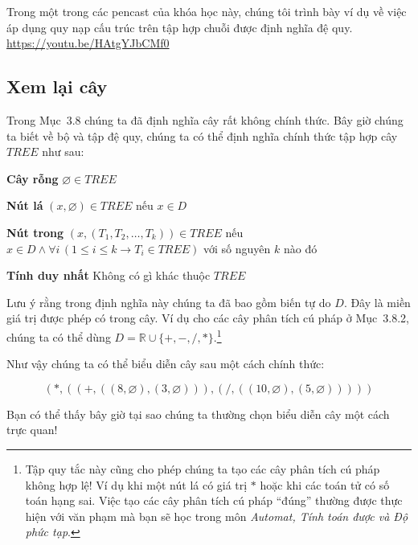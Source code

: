 \begin{infobox}
Trong một trong các pencast của khóa học này, chúng tôi trình bày ví dụ về việc áp dụng quy nạp cấu trúc trên tập hợp chuỗi được định nghĩa đệ quy. \url{https://youtu.be/HAtgYJbCMf0}
\end{infobox}

\subsection{Xem lại cây}

Trong Mục~3.8 chúng ta đã định nghĩa cây rất không chính thức. Bây giờ chúng ta biết về bộ và tập đệ quy, chúng ta có thể định nghĩa chính thức tập hợp cây $TREE$ như sau:

\medskip
\noindent\textbf{Cây rỗng} $\varnothing \in TREE$

\noindent\textbf{Nút lá} $(x, \varnothing) \in TREE$ nếu $x \in D$

\noindent\textbf{Nút trong} $(x, (T_1, T_2, \ldots, T_k)) \in TREE$ nếu $x \in D \land \forall i\,(1 \leq i \leq k \to T_i \in TREE)$ với số nguyên $k$ nào đó

\noindent\textbf{Tính duy nhất} Không có gì khác thuộc $TREE$

\medskip
Lưu ý rằng trong định nghĩa này chúng ta đã bao gồm biến tự do $D$. Đây là miền giá trị được phép có trong cây. Ví dụ cho các cây phân tích cú pháp ở Mục~3.8.2, chúng ta có thể dùng $D = \mathbb{R} \cup \{+, -, /, *\}$.\footnote{Tập quy tắc này cũng cho phép chúng ta tạo các cây phân tích cú pháp không hợp lệ! Ví dụ khi một nút lá có giá trị $*$ hoặc khi các toán tử có số toán hạng sai. Việc tạo các cây phân tích cú pháp ``đúng'' thường được thực hiện với văn phạm mà bạn sẽ học trong môn \textit{Automat, Tính toán được và Độ phức tạp}.}

Như vậy chúng ta có thể biểu diễn cây sau một cách chính thức:

\[
(*, ((+, ((8, \varnothing), (3, \varnothing))), (/, ((10, \varnothing), (5, \varnothing)))))
\]

Bạn có thể thấy bây giờ tại sao chúng ta thường chọn biểu diễn cây một cách trực quan!

\begin{center}
\end{center}

